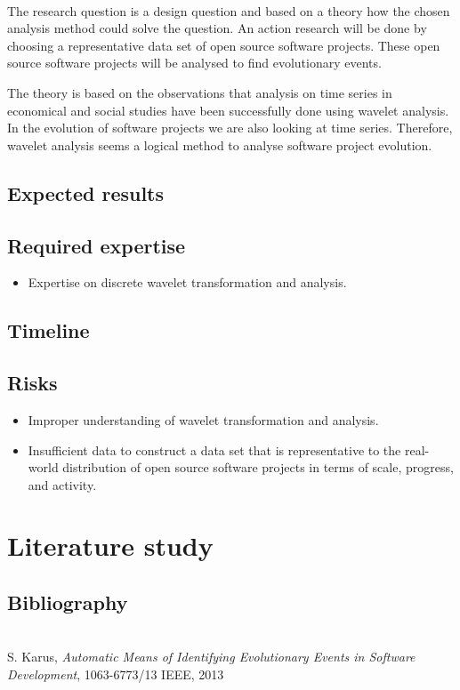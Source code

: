 \documentclass[9pt,a4paper]{article}
\begin{document}
\paragraph{}
The research question is a design question and based on a theory how the chosen
analysis method could solve the question. An action research will be done by
choosing a representative data set of open source software projects. These open
source software projects will be analysed to find evolutionary events.

The theory is based on the observations that analysis on time series in
economical and social studies have been successfully done using wavelet
analysis. In the evolution of software projects we are also looking at time
series. Therefore, wavelet analysis seems a logical method to analyse software
project evolution.

\subsection{Expected results}

\subsection{Required expertise}
\begin{itemize}
	\item Expertise on discrete wavelet transformation and analysis.
\end{itemize}

\subsection{Timeline}

\subsection{Risks}
\begin{itemize}
	\item Improper understanding of wavelet transformation and analysis.
	\item Insufficient data to construct a data set that is representative to the
			real-world distribution of open source software projects in terms of scale,
			progress, and activity.
\end{itemize}

\section{Literature study}

\subsection{Bibliography}
\begingroup
\renewcommand{\section}[2]{}%
\begin{thebibliography}{99}
	 \hfill \\ S. Karus, \emph{Automatic Means of
	Identifying Evolutionary Events in Software Development}, 1063-6773/13 IEEE,
	2013
\end{thebibliography}
\endgroup
\end{document}

